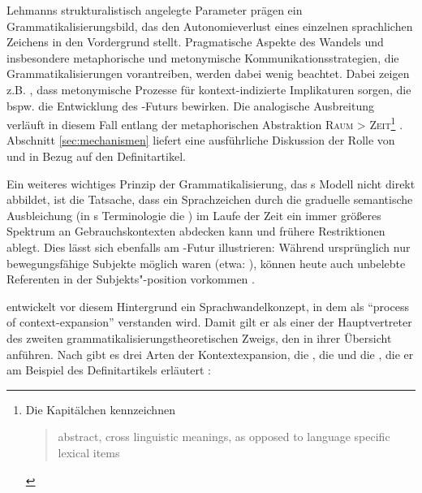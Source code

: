 Lehmanns strukturalistisch angelegte Parameter  prägen ein Grammatikalisierungsbild, das den Autonomieverlust eines einzelnen sprachlichen Zeichens in den Vordergrund stellt. Pragmatische Aspekte des Wandels und insbesondere metaphorische  und metonymische  Kommunikationsstrategien, die Grammatikalisierungen  vorantreiben, werden dabei wenig beachtet. Dabei zeigen z.B. \textcite[84--93]{Hopper2006}, dass metonymische  Prozesse für kontext-indizierte Implikaturen sorgen, die bspw. die Entwicklung des -Futurs bewirken. Die analogische Ausbreitung  verläuft in diesem Fall entlang der metaphorischen  Abstraktion \textsc{Raum > Zeit}\footnote{Die Kapitälchen kennzeichnen \blockcquote[85]{Hopper2006}{abstract, cross linguistic meanings, as opposed to language specific lexical items}.} \parencite[s. auch][45--46]{Heine1991}. Abschnitt \ref{sec:mechanismen} liefert eine ausführliche Diskussion der Rolle von  und  in Bezug auf den Definitartikel. 

Ein weiteres wichtiges Prinzip der Grammatikalisierung, das \citeauthor{Lehmann1995}s Modell nicht direkt abbildet, ist die Tatsache, dass ein Sprachzeichen durch die graduelle semantische Ausbleichung  (in \citeauthor{Lehmann1995}s  Terminologie die ) im Laufe der Zeit ein immer größeres Spektrum an Gebrauchskontexten abdecken kann und frühere Restriktionen ablegt. Dies lässt sich ebenfalls am -Futur illustrieren: Während ursprünglich  nur bewegungsfähige Subjekte  möglich waren (etwa: ), können heute auch unbelebte Referenten  in der Subjekts"-position vorkommen  \parencite[etwa: ; Beispiele nach][5--6]{Bybee1994}. 

\textcite{Himmelmann1997,Himmelmann2004} entwickelt vor diesem Hintergrund ein Sprachwandelkonzept, in dem  als "`process of context-expansion"'\linebreak \parencite[32]{Himmelmann2004}  verstanden wird. Damit gilt er als einer der Hauptvertreter des zweiten grammatikalisierungstheoretischen Zweigs, den \textcite[105--109]{Traugott2013} in ihrer Übersicht anführen. Nach \citeauthor{Himmelmann2004} gibt es drei Arten der Kontextexpansion, die  , die  und die , die er am Beispiel des Definitartikels erläutert \parencite[s.][32--33]{Himmelmann2004}: 

